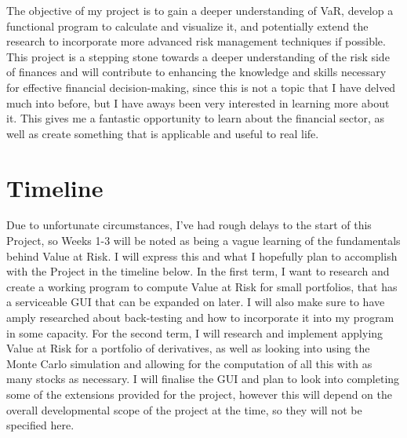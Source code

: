 \documentclass{article}
\begin{document}
The objective of my project is to gain a deeper understanding of VaR, develop a functional program to calculate and visualize it, and potentially extend the research to incorporate more advanced risk management techniques if possible. This project is a stepping stone towards a deeper understanding of the risk side of finances and will contribute to enhancing the knowledge and skills necessary for effective financial decision-making, since this is not a topic that I have delved much into before, but I have aways been very interested in learning more about it. This gives me a fantastic opportunity to learn about the financial sector, as well as create something that is applicable and useful to real life. \\


\section{Timeline}
Due to unfortunate circumstances, I've had rough delays to the start of this Project, so Weeks 1-3 will be noted as being a vague learning of the fundamentals behind Value at Risk. I will express this and what I hopefully plan to accomplish with the Project in the timeline below. In the first term, I want to research and create a working program to compute Value at Risk for small portfolios, that has a serviceable GUI that can be expanded on later. I will also make sure to have amply researched about back-testing and how to incorporate it into my program in some capacity. For the second term, I will research and implement applying Value at Risk for a portfolio of derivatives, as well as looking into using the Monte Carlo simulation and allowing for the computation of all this with as many stocks as necessary. I will finalise the GUI and plan to look into completing some of the extensions provided for the project, however this will depend on the overall developmental scope of the project at the time, so they will not be specified here.
\end{document}
